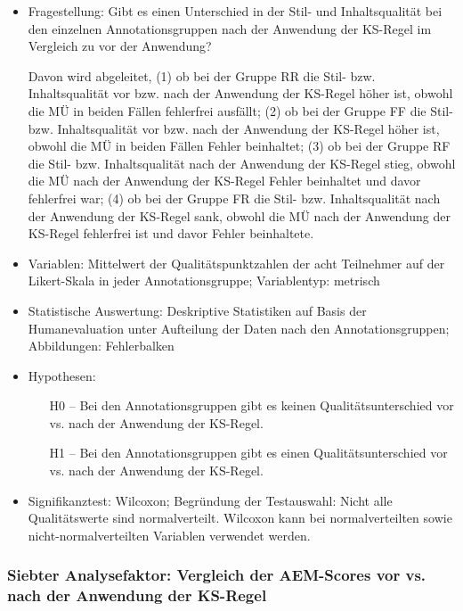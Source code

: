 \begin{itemize}
\item Fragestellung: Gibt es einen Unterschied in der Stil- und Inhaltsqualität bei den einzelnen Annotationsgruppen nach der Anwendung der KS-Regel im Vergleich zu vor der Anwendung?

Davon wird abgeleitet, (1) ob bei der Gruppe RR die Stil- bzw. Inhaltsqualität vor bzw. nach der Anwendung der KS-Regel höher ist, obwohl die MÜ in beiden Fällen fehlerfrei ausfällt; (2) ob bei der Gruppe FF die Stil- bzw. Inhaltsqualität vor bzw. nach der Anwendung der KS-Regel höher ist, obwohl die MÜ in beiden Fällen Fehler beinhaltet; (3) ob bei der Gruppe RF die Stil- bzw. Inhaltsqualität nach der Anwendung der KS-Regel stieg, obwohl die MÜ nach der Anwendung der KS-Regel Fehler beinhaltet und davor fehlerfrei war; (4) ob bei der Gruppe FR die Stil- bzw. Inhaltsqualität nach der Anwendung der KS-Regel sank, obwohl die MÜ nach der Anwendung der KS-Regel fehlerfrei ist und davor Fehler beinhaltete.

\item Variablen: Mittelwert der Qualitätspunktzahlen der acht Teilnehmer auf der Likert-Skala in jeder Annotationsgruppe; Variablentyp: metrisch
\item Statistische Auswertung: Deskriptive Statistiken auf Basis der Humanevaluation unter Aufteilung der Daten nach den Annotationsgruppen; Abbildungen: Fehlerbalken
\item Hypothesen:
  \begin{itemize}[align = left]

  \item[H0 --] Bei den Annotationsgruppen gibt es keinen Qualitätsunterschied vor vs. nach der Anwendung der KS-Regel.

  \item[H1 --] Bei den Annotationsgruppen gibt es einen Qualitätsunterschied vor vs. nach der Anwendung der KS-Regel.

  \end{itemize}
\item Signifikanztest: Wilcoxon; Begründung der Testauswahl: Nicht alle Qualitätswerte sind normalverteilt. Wilcoxon kann bei normalverteilten sowie nicht-normalverteilten Variablen verwendet werden.
\end{itemize}

\subsubsection{Siebter Analysefaktor: Vergleich der AEM-Scores vor vs. nach der Anwendung der KS-Regel}

